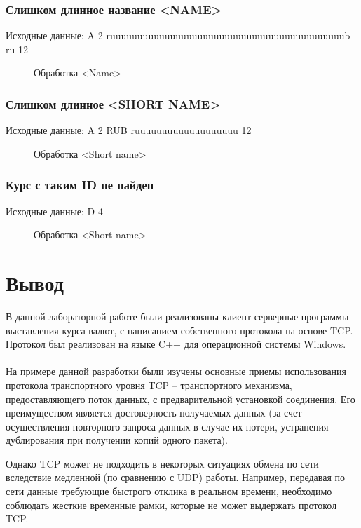 \documentclass[a4paper,14pt]{article}
\begin{document}
\subsubsection {Слишком длинное название <NAME>}
Исходные данные: A 2 ruuuuuuuuuuuuuuuuuuuuuuuuuuuuuuuuuuuuuuuuuuub ru 12

\begin{figure}[h!]
	\noindent\centering{
		\texttt{[image: 10]}}
	\caption{Обработка <Name>}
	\label{figCurves}
\end{figure}

\subsubsection {Слишком длинное <SHORT NAME>}
Исходные данные: A 2 RUB ruuuuuuuuuuuuuuuuuuu 12

\begin{figure}[h!]
	\noindent\centering{
		\texttt{[image: 10]}}
	\caption{Обработка <Short name>}
	\label{figCurves}
\end{figure}

\subsubsection {Курс с таким ID не найден}
Исходные данные: D 4

\begin{figure}[h!]
	\noindent\centering{
		\texttt{[image: 14]}}
	\caption{Обработка <Short name>}
	\label{figCurves}
\end{figure}
\section{Вывод}
В данной лабораторной работе были реализованы клиент-серверные программы выставления курса валют, с написанием собственного протокола на основе TCP. Протокол был реализован на языке C++ для операционной системы Windows.\\\\
На примере данной разработки были изучены основные приемы использования протокола транспортного уровня TCP – транспортного механизма, предоставляющего поток данных, с предварительной установкой соединения. Его преимуществом является достоверность получаемых данных (за счет осуществления повторного запроса данных в случае их потери, устранения дублирования при получении копий одного пакета).

Однако TCP может не подходить в некоторых ситуациях обмена по сети вследствие медленной (по сравнению с UDP) работы. Например, передавая по сети данные требующие быстрого отклика в реальном времени, необходимо соблюдать жесткие временные рамки, которые не может выдержать протокол TCP.
\end{document}
